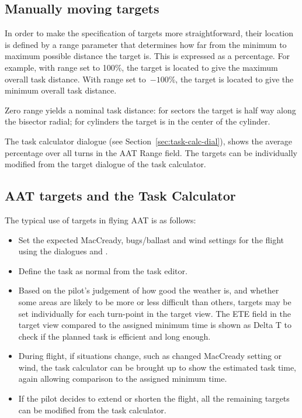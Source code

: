 \subsection*{Manually moving targets}

In order to make the specification of targets more straightforward,
their location is defined by a range parameter that determines how
far from the minimum to maximum possible distance the target is.  This
is expressed as a percentage.  For example, with range set to 100\%,
the target is located to give the maximum overall task distance.  With
range set to~$-100$\%, the target is located to give the minimum overall
task distance.

Zero range yields a nominal task distance: for sectors the target is
half way along the bisector radial; for cylinders the target is in the
center of the cylinder.

The task calculator dialogue (see Section~\ref{sec:task-calc-dial}), shows the
average percentage over all turns in the AAT Range field.
The targets can be individually modified from the target dialogue of the task
calculator.


\subsection*{AAT targets and the Task Calculator}

The typical use of targets in flying AAT is as follows:
\begin{itemize}
\item Set the expected MacCready, bugs/ballast and wind settings
  for the flight using the dialogues  and .
\item Define the task as normal from the task editor.
\item Based on the pilot's judgement of how good the weather is,
  and whether some areas are likely to be more or less difficult than
  others, targets may be set individually for each turn-point in the
  target view.  The ETE field in the target view compared to
  the assigned minimum time is shown as Delta T to check if the planned
  task is efficient and long enough.
\item During flight, if situations change, such as changed MacCready setting
  or wind, the task calculator can be brought up to show the estimated
  task time, again allowing comparison to the assigned minimum time.
\item If the pilot decides to extend or shorten the flight, all the remaining
  targets can be modified from the task calculator.
\end{itemize}

